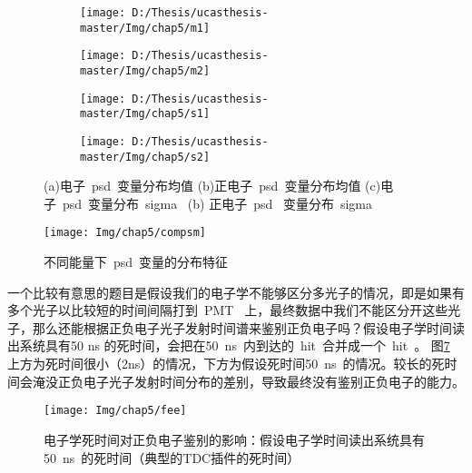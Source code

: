 \begin{figure}[!htbp]
  \centering
  \begin{subfigure}[b]{\MySubFactor\textwidth}
    \texttt{[image: D:/Thesis/ucasthesis-master/Img/chap5/m1]}
    \caption{}
    \label{fig:p59_1}
  \end{subfigure}%
  \quad\quad\quad\quad\quad\quad%
  \begin{subfigure}[b]{\MySubFactor\textwidth}
    \texttt{[image: D:/Thesis/ucasthesis-master/Img/chap5/m2]}
    \caption{}
    \label{fig:p59_2}
  \end{subfigure}
   \begin{subfigure}[b]{\MySubFactor\textwidth}
    \texttt{[image: D:/Thesis/ucasthesis-master/Img/chap5/s1]}
    \caption{}
    \label{fig:p59_3}
  \end{subfigure}%
  \quad\quad\quad\quad\quad\quad%
  \begin{subfigure}[b]{\MySubFactor\textwidth}
    \texttt{[image: D:/Thesis/ucasthesis-master/Img/chap5/s2]}
    \caption{}
    \label{fig:p59_4}
  \end{subfigure}
  \caption{(a)电子~psd~变量分布均值 (b)正电子~psd~变量分布均值 (c)电子~psd~变量分布~sigma~ (b) 正电子~psd~ 变量分布~sigma~}
  \label{fig:p59}
\end{figure}



\begin{figure}[!htbp]
  \centering
   \texttt{[image: Img/chap5/compsm]}
    \caption{不同能量下~psd~变量的分布特征}
  \label{fig:p510}
\end{figure}
一个比较有意思的题目是假设我们的电子学不能够区分多光子的情况，即是如果有多个光子以比较短的时间间隔打到~PMT~ 上，最终数据中我们不能区分开这些光子，那么还能根据正负电子光子发射时间谱来鉴别正负电子吗？假设电子学时间读出系统具有50 ns 的死时间，会把在50~ns~内到达的~hit~合并成一个~hit~。 图\ref{fig:p511} 上方为死时间很小（2ns）的情况，下方为假设死时间50~ns~的情况。较长的死时间会淹没正负电子光子发射时间分布的差别，导致最终没有鉴别正负电子的能力。

\begin{figure}[!htbp]
  \centering
   \texttt{[image: Img/chap5/fee]}
    \caption{电子学死时间对正负电子鉴别的影响：假设电子学时间读出系统具有50~ns~的死时间（典型的TDC插件的死时间）}
  \label{fig:p511}
\end{figure}
